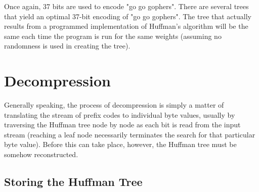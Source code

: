 \documentclass[12pt]{report}
\begin{document}
Once again, 37 bits are used to encode "go go gophers". There are several trees that yield an optimal 37-bit encoding of "go go gophers". The tree that actually results from a programmed implementation of Huffman's algorithm will be the same each time the program is run for the same weights (assuming no randomness is used in creating the tree).



\pagestyle{fancy}
\chead{}
\rfoot{\small{\thepage}}
\renewcommand{\headrulewidth}{0.4pt}
\renewcommand{\footrulewidth}{0.4pt}

\chapter{Decompression}

Generally speaking, the process of decompression is simply a matter of translating the stream of prefix codes to individual byte values, usually by traversing the Huffman tree node by node as each bit is read from the input stream (reaching a leaf node necessarily terminates the search for that particular byte value). Before this can take place, however, the Huffman tree must be somehow reconstructed.

\section{Storing the Huffman Tree}
\end{document}
